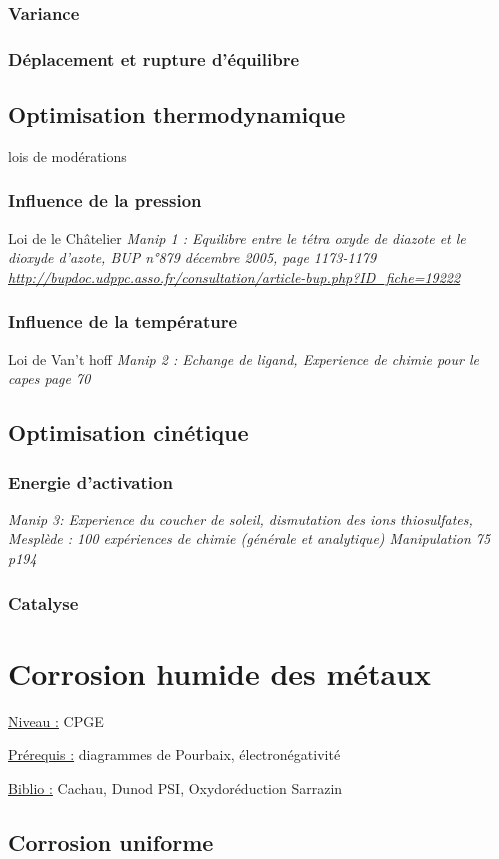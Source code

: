 \documentclass{article}%
\begin{document}
\subsubsection{Variance}
\subsubsection{Déplacement et rupture d'équilibre}
\subsection{Optimisation thermodynamique}
lois de modérations
\subsubsection{Influence de la pression}
Loi de le Châtelier
\textit{Manip 1 : Equilibre entre le tétra oxyde de diazote et le dioxyde d’azote, BUP n°879 décembre 2005, page 1173-1179 \url{http://bupdoc.udppc.asso.fr/consultation/article-bup.php?ID\_fiche=19222}}
\subsubsection{Influence de la température}
Loi de Van't hoff
\textit{Manip 2 : Echange de ligand, Experience de chimie pour le capes page 70}
\subsection{Optimisation cinétique}
\subsubsection{Energie d'activation}
\textit{Manip 3: Experience du coucher de soleil, dismutation des ions thiosulfates, Mesplède : 100 expériences de chimie (générale et analytique) Manipulation 75 p194}
\subsubsection{Catalyse}
\section{Corrosion humide des métaux}
\underline{Niveau :} CPGE 

\underline{Prérequis :} diagrammes de Pourbaix, électronégativité

\underline{Biblio :} Cachau, Dunod PSI, Oxydoréduction Sarrazin

\subsection{Corrosion uniforme}
\end{document}
